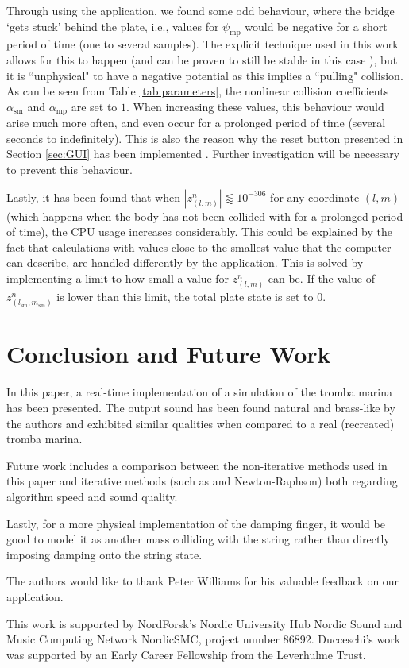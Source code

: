 \documentclass[dvipsnames, pdftex]{article}
\def\SWcomment[#1]{\textcolor{Bittersweet}{#1}}
\def\up{z}
\begin{document}
Through using the application, we found some odd behaviour, where the bridge `gets stuck' behind the plate, i.e., values for $\psi_\text{mp}$ would be negative for a short period of time (one to several samples). The explicit technique used in this work allows for this to happen (and can be proven to still be stable in this case \cite{Ducceschi2019}), but it is ``unphysical" to have a negative potential as this implies a ``pulling" collision. As can be seen from Table \ref{tab:parameters}, the nonlinear collision coefficients $\alpha_\text{sm}$ and $\alpha_\text{mp}$ are set to $1$. When increasing these values, this behaviour would arise much more often, and even occur for a prolonged period of time (several seconds to indefinitely). This is also the reason why the reset button presented in Section \ref{sec:GUI} has been implemented%
. Further investigation will be necessary to prevent this behaviour.

Lastly, it has been found that when $|\up_{(l,m)}^n| \lessapprox 10^{-306}$ for any coordinate $(l,m)$ (which happens when the body has not been collided with for a prolonged period of time), the CPU usage increases considerably. This could be explained by the fact that calculations with values close to the smallest value that the computer can describe, are handled differently by the application.  %
This is solved by implementing a limit to how small a value for $\up_{(l,m)}^n$ can be. If the value of $\up_{(l_\text{sm},m_\text{sm})}^n$ is lower than this limit, the total plate state is set to $0$. 

\section{Conclusion and Future Work}\label{sec:conclusion}
In this paper, a real-time implementation of a simulation of the tromba marina has been presented. The output sound has been found natural and brass-like by the authors and exhibited similar qualities when compared to a real (recreated) tromba marina.

Future work includes a comparison between the non-iterative methods used in this paper and iterative methods (such as and Newton-Raphson) both regarding algorithm speed and sound quality. 

Lastly, for a more physical implementation of the damping finger, it would be good to model it as another mass colliding with the string rather than directly imposing damping onto the string state.

\begin{acknowledgments}
The authors would like to thank Peter Williams for his valuable feedback on our application.

This work is supported by NordForsk's Nordic
University Hub Nordic Sound and Music Computing Network
NordicSMC, project number 86892. Ducceschi's work was supported by an Early Career Fellowship from the Leverhulme Trust.
\end{acknowledgments} 

{%

}
\end{document}
